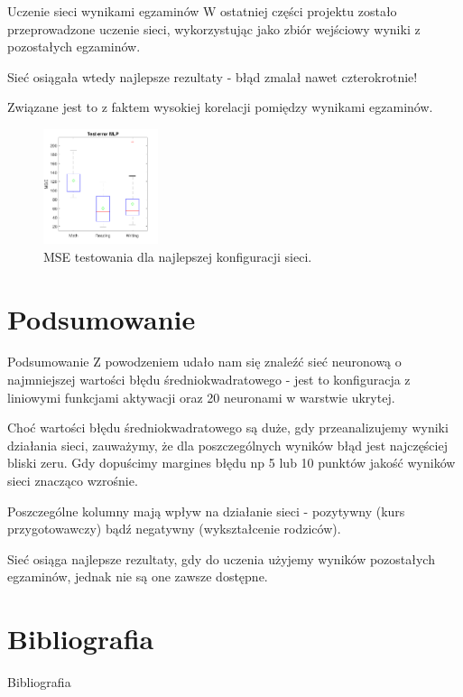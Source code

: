 \documentclass[10pt]{beamer}
\begin{document}
\begin{frame}[fragile]{Uczenie sieci wynikami egzaminów}
W ostatniej części projektu zostało przeprowadzone uczenie sieci, wykorzystując jako zbiór wejściowy wyniki z pozostałych egzaminów.

Sieć osiągała wtedy najlepsze rezultaty - błąd zmalał nawet czterokrotnie!

Związane jest to z faktem wysokiej korelacji pomiędzy wynikami egzaminów.

\begin{figure}[H]
\centering
\includegraphics[width=0.3\textwidth]{../report/static/cz3_egz_test.pdf}
\caption{ MSE testowania dla najlepszej konfiguracji sieci.}
\end{figure}

\end{frame}

\section{Podsumowanie}

\begin{frame}[fragile]{Podsumowanie}
Z powodzeniem udało nam się znaleźć sieć neuronową o najmniejszej wartości błędu średniokwadratowego - jest to konfiguracja z liniowymi funkcjami aktywacji oraz 20 neuronami w warstwie ukrytej.

Choć wartości błędu średniokwadratowego są duże, gdy przeanalizujemy wyniki działania sieci, zauważymy, że dla poszczególnych wyników błąd jest najczęściej bliski zeru. Gdy dopuścimy margines błędu np 5 lub 10 punktów jakość wyników sieci znacząco wzrośnie.

Poszczególne kolumny mają wpływ na działanie sieci - pozytywny (kurs przygotowawczy)  bądź negatywny (wykształcenie rodziców).

Sieć osiąga najlepsze rezultaty, gdy do uczenia użyjemy wyników pozostałych egzaminów, jednak nie są one zawsze dostępne.
\end{frame}


\section{Bibliografia}
\begin{frame}[allowframebreaks]{Bibliografia}


\nocite{*}
\end{frame}
\end{document}
